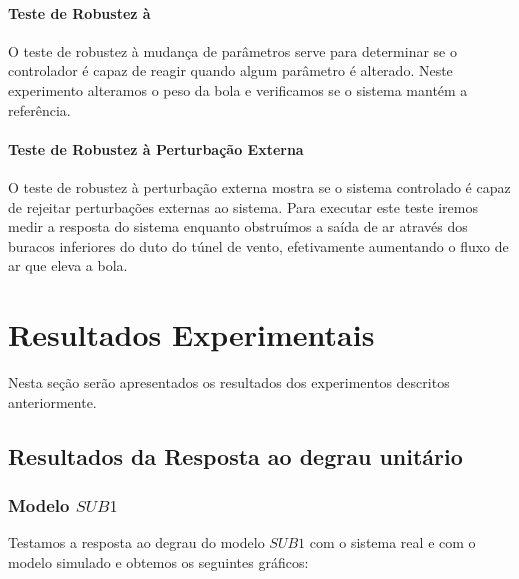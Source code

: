 \paragraph{Teste de Robustez à  }

O teste de robustez à mudança de parâmetros serve para determinar se o controlador é capaz de reagir quando algum parâmetro é alterado. Neste experimento alteramos o peso da bola e verificamos se o sistema mantém a referência. 

\paragraph{Teste de Robustez à Perturbação Externa}
  O teste de robustez à perturbação externa mostra se o sistema controlado é capaz de rejeitar perturbações externas ao sistema. Para executar este teste iremos medir a resposta do sistema enquanto obstruímos a saída de ar através dos buracos inferiores do duto do túnel de vento, efetivamente aumentando o fluxo de ar que eleva a bola.

\section{Resultados Experimentais}
Nesta seção serão apresentados os resultados dos experimentos descritos anteriormente.
\subsection{Resultados da Resposta ao degrau unitário}\label{rstep}

\subsubsection{Modelo $SUB1$}
Testamos a resposta ao degrau do modelo $SUB1$ com o sistema real e com o modelo simulado e obtemos os seguintes gráficos:

